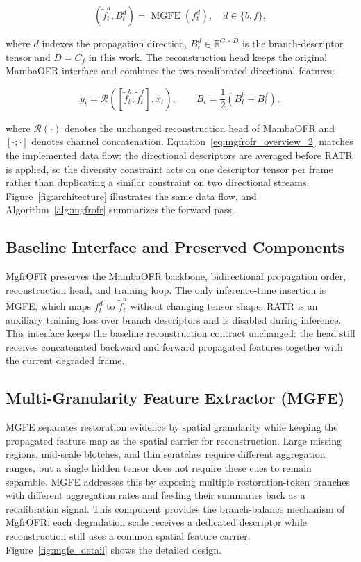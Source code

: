 \begin{equation}
\left(\widetilde{f}_t^{d}, B_t^{d}\right)=\operatorname{MGFE}\!\left(f_t^{d}\right), \quad d \in \{b,f\},
\end{equation}

where $d$ indexes the propagation direction, $B_t^{d} \in \mathbb{R}^{G \times D}$ is the branch-descriptor tensor and $D=C_f$ in this work. The reconstruction head keeps the original MambaOFR interface and combines the two recalibrated directional features:

\begin{equation}
y_t = \mathcal{R}\!\left([\widetilde{f}_t^{b};\widetilde{f}_t^{f}], x_t\right),
\qquad
B_t = \frac{1}{2}\left(B_t^{b}+B_t^{f}\right),
\label{eq:mgfrofr_overview_2}
\end{equation}

where $\mathcal{R}(\cdot)$ denotes the unchanged reconstruction head of MambaOFR and $[\cdot;\cdot]$ denotes channel concatenation. Equation~\eqref{eq:mgfrofr_overview_2} matches the implemented data flow: the directional descriptors are averaged before RATR is applied, so the diversity constraint acts on one descriptor tensor per frame rather than duplicating a similar constraint on two directional streams. Figure~\ref{fig:architecture} illustrates the same data flow, and Algorithm~\ref{alg:mgfrofr} summarizes the forward pass.

\subsection{Baseline Interface and Preserved Components}
\label{subsec:baseline_interface}

MgfrOFR preserves the MambaOFR backbone, bidirectional propagation order, reconstruction head, and training loop. The only inference-time insertion is MGFE, which maps $f_t^{d}$ to $\widetilde{f}_t^{d}$ without changing tensor shape. RATR is an auxiliary training loss over branch descriptors and is disabled during inference. This interface keeps the baseline reconstruction contract unchanged: the head still receives concatenated backward and forward propagated features together with the current degraded frame.

\subsection{Multi-Granularity Feature Extractor (MGFE)}
\label{subsec:mgfe}

MGFE separates restoration evidence by spatial granularity while keeping the propagated feature map as the spatial carrier for reconstruction. Large missing regions, mid-scale blotches, and thin scratches require different aggregation ranges, but a single hidden tensor does not require these cues to remain separable. MGFE addresses this by exposing multiple restoration-token branches with different aggregation rates and feeding their summaries back as a recalibration signal. This component provides the branch-balance mechanism of MgfrOFR: each degradation scale receives a dedicated descriptor while reconstruction still uses a common spatial feature carrier. Figure~\ref{fig:mgfe_detail} shows the detailed design.

